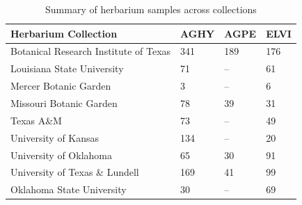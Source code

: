 \documentclass[11pt]{article}
\begin{document}
	
	\begin{table}[h]
		\caption{Summary of herbarium samples across collections}
		\label{Table:herbaria}
		\centering
		\begin{tabular}{llll}\hline
			Herbarium Collection        & AGHY        & AGPE      &      ELVI\\ \hline
			Botanical Research Institute of Texas &   341   &    189&    176    \\
			Louisiana State University &     71  & --  &   61       \\
			Mercer Botanic Garden &   3    & --     &     6\\
			Missouri Botanic Garden& 78 & 39& 31\\
		    Texas A\&M &  73&-- & 49 \\
		    University of Kansas & 134 & -- &  20\\
		    University of Oklahoma & 65 &30&  91\\
		    University of Texas  \& Lundell   &  169& 41& 99\\		    				 			     			     
			Oklahoma State University&     30  &   --    &  69 \\ \hline
		\end{tabular}
		\bigskip{}

	\end{table}
	
	
	
	
	
	\newpage{}


	
	\newpage{}
	

	
\end{document}
